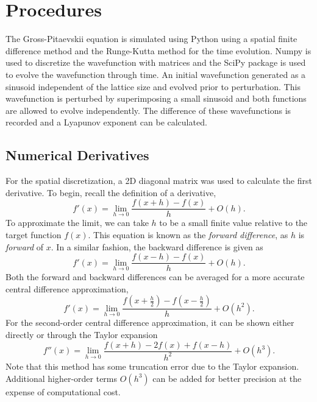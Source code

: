 \addchapheadtotoc

\chapter{Procedures}

The Gross-Pitaevskii equation is simulated using Python using a spatial finite difference method and the Runge-Kutta method for the time evolution. Numpy is used to discretize the wavefunction with matrices and the SciPy package is used to evolve the wavefunction through time. An initial wavefunction generated as a sinusoid independent of the lattice size and evolved prior to perturbation. This wavefunction is perturbed by superimposing a small sinusoid and both functions are allowed to evolve independently. The difference of these wavefunctions is recorded and a Lyapunov exponent can be calculated. 

\section{Numerical Derivatives}
For the spatial discretization, a 2D diagonal matrix was used to calculate the first derivative. To begin, recall the definition of a derivative, \begin{equation}
	f'(x) = \lim_{h \to 0} \frac{ f(x+h) - f(x) }{h} + O(h).
\end{equation}
To approximate the limit, we can take $h$ to be a small finite value relative to the target function $f(x)$. This equation is known as the \textit{forward difference}, as $h$ is \textit{forward} of $x$. In a similar fashion, the backward difference is given as \begin{equation}
	f'(x) = \lim_{h \to 0} \frac{f(x-h) - f(x)}{h} + O(h).
\end{equation}
Both the forward and backward differences can be averaged for a more accurate central difference approximation, \begin{equation}
	f'(x) = \lim_{h \to 0} \frac{f\left(x+\frac{h}{2}\right) - f\left(x - \frac{h}{2}\right)}{h} + O(h^2).
\end{equation}
For the second-order central difference approximation, it can be shown either directly or through the Taylor expansion \begin{equation}
	f''(x) = \lim_{h \to 0} \frac{f(x+h) - 2f(x) + f(x-h)}{h^2} + O(h^3).
\end{equation}
Note that this method has some truncation error due to the Taylor expansion. Additional higher-order terms $O(h^3)$ can be added for better precision at the expense of computational cost. 

